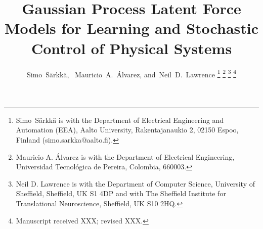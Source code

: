 \documentclass[journal]{IEEEtran}
\begin{document}
%
\title{Gaussian Process Latent Force Models for Learning and Stochastic Control of Physical Systems}


%
%
%

\author{Simo~S\"arkk\"a,~
        Mauricio~A.~\'Alvarez, 
        and~Neil~D.~Lawrence%
\thanks{Simo~S\"arkk\"a is with the Department of Electrical Engineering and Automation (EEA), Aalto University, Rakentajanaukio 2, 02150 Espoo, Finland (simo.sarkka@aalto.fi).}%
\thanks{Mauricio A. \'Alvarez is with the Department of Electrical Engineering,
Universidad Tecnol\'ogica de Pereira, Colombia, 660003.}%
\thanks{Neil D. Lawrence is with the Department of Computer Science, University of Sheffield,
Sheffield, UK S1 4DP and with The Sheffield Institute for Translational Neuroscience,
Sheffield, UK S10 2HQ.}%
\thanks{Manuscript received XXX; revised XXX.}}


%
%
\end{document}
